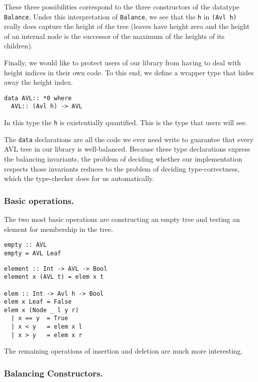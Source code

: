 These three possibilities correspond to the three constructors of the
datatype \verb|Balance|.
Under this interpretation of \verb|Balance|, we see that the \verb|h| in 
\verb|(Avl h)| really does capture the height of the tree (leaves have height 
zero and the height of an internal node is the successor of the maximum of 
the heights of its children).

Finally, we would like to protect users of our library from having to 
deal with height indices in their own code.  To this end, we define a 
wrapper type that hides away the height index.

{\small
\begin{verbatim}
data AVL:: *0 where
  AVL:: (Avl h) -> AVL
\end{verbatim}
}
\noindent
In this type the {\tt h} is existentially quantified.
This is the type that users will see.

The {\tt data} declarations are all the code we ever need write to guarantee that every AVL tree 
in our library is well-balanced.  Because these type declarations express the
balancing invariants, the problem of deciding whether our implementation 
respects those invariants reduces to the problem of deciding type-correctness,
which the \om{} type-checker does for us automatically.

\subsubsection{Basic operations.}

The two most basic operations are constructing an empty tree and testing 
an element for membership in the tree.
{\small
\begin{verbatim}
empty :: AVL
empty = AVL Leaf
\end{verbatim}

\begin{verbatim}
element :: Int -> AVL -> Bool
element x (AVL t) = elem x t

elem :: Int -> Avl h -> Bool
elem x Leaf = False
elem x (Node _ l y r)
  | x == y  = True
  | x < y   = elem x l
  | x > y   = elem x r
\end{verbatim}
}
\noindent
The remaining operations of insertion and deletion are much more interesting.

\subsubsection{Balancing Constructors.}

